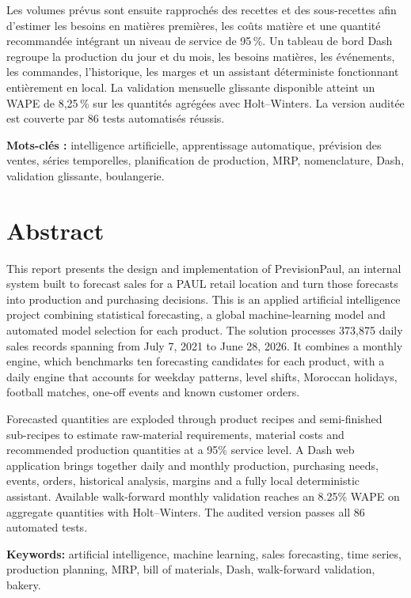 \documentclass[12pt,a4paper,oneside]{report}
\newcommand{\NomProjet}{PrevisionPaul}
\begin{document}
Les volumes prévus sont ensuite rapprochés des recettes et des sous-recettes afin
d'estimer les besoins en matières premières, les coûts matière et une quantité
recommandée intégrant un niveau de service de 95\,\%. Un tableau de bord Dash
regroupe la production du jour et du mois, les besoins matières, les événements,
les commandes, l'historique, les marges et un assistant déterministe fonctionnant
entièrement en local. La validation mensuelle glissante disponible atteint un
WAPE de 8,25\,\% sur les quantités agrégées avec Holt--Winters. La version auditée
est couverte par 86 tests automatisés réussis.

\textbf{Mots-clés :} intelligence artificielle, apprentissage automatique,
prévision des ventes, séries temporelles, planification de production, MRP,
nomenclature, Dash, validation glissante, boulangerie.

\clearpage
\chapter*{Abstract}
This report presents the design and implementation of \NomProjet, an internal
system built to forecast sales for a PAUL retail location and turn those forecasts
into production and purchasing decisions. This is an applied artificial
intelligence project combining statistical forecasting, a global machine-learning
model and automated model selection for each product. The solution processes 373,875 daily
sales records spanning from July 7, 2021 to June 28, 2026. It combines a monthly
engine, which benchmarks ten forecasting candidates for each product, with a daily engine
that accounts for weekday patterns, level shifts, Moroccan holidays, football
matches, one-off events and known customer orders.

Forecasted quantities are exploded through product recipes and semi-finished
sub-recipes to estimate raw-material requirements, material costs and recommended
production quantities at a 95\% service level. A Dash web application brings
together daily and monthly production, purchasing needs, events, orders,
historical analysis, margins and a fully local deterministic assistant. Available
walk-forward monthly validation reaches an 8.25\% WAPE on aggregate quantities
with Holt--Winters. The audited version passes all 86 automated tests.

\textbf{Keywords:} artificial intelligence, machine learning, sales forecasting,
time series, production planning, MRP, bill of materials, Dash, walk-forward
validation, bakery.
\end{document}
